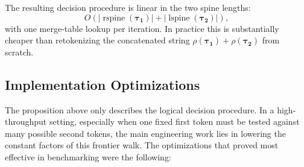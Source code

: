 The resulting decision procedure is linear in the two spine lengths:
\[
O(|\operatorname{rspine}(\boldsymbol{\tau_1})| + |\operatorname{lspine}(\boldsymbol{\tau_2})|),
\]
with one merge-table lookup per iteration.
In practice this is substantially cheaper than retokenizing the concatenated string
$\rho(\boldsymbol{\tau_1}) + \rho(\boldsymbol{\tau_2})$ from scratch.

\subsection{Implementation Optimizations}

The proposition above only describes the logical decision procedure. In a high-throughput setting,
especially when one fixed first token must be tested against many possible second tokens, the main
engineering work lies in lowering the constant factors of this frontier walk. The optimizations that
proved most effective in benchmarking were the following:

